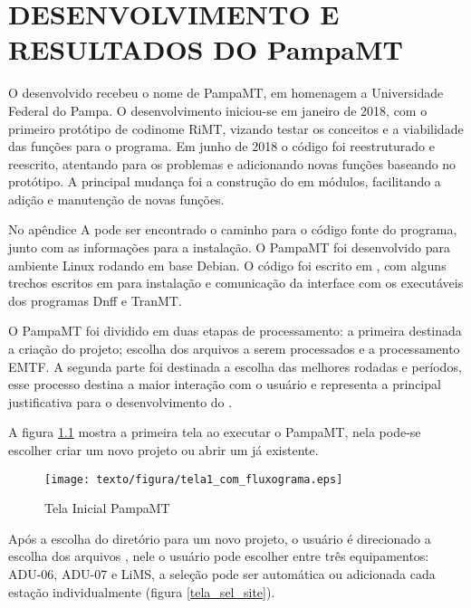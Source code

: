 \chapter{DESENVOLVIMENTO E RESULTADOS DO PampaMT}

    O  desenvolvido recebeu o nome de PampaMT, em homenagem a Universidade Federal do Pampa. O desenvolvimento iniciou-se em janeiro de 2018, com o primeiro protótipo de codinome RiMT, vizando testar os conceitos e a viabilidade das funções para o programa. Em junho de 2018 o código foi reestruturado e reescrito, atentando para os problemas e adicionando novas funções baseando no protótipo. A principal mudança foi a construção do  em módulos, facilitando a adição e manutenção de novas funções.
    
    No apêndice A pode ser encontrado o caminho para o código fonte do programa, junto com as informações para a instalação. O PampaMT foi desenvolvido para ambiente Linux rodando em base Debian. O código foi escrito em \Python, com alguns trechos escritos em \Shell{} para instalação e comunicação da interface com os executáveis dos programas Dnff e TranMT.
    
    O PampaMT foi dividido em duas etapas de processamento: a primeira destinada a criação do projeto; escolha dos arquivos a serem processados e a processamento EMTF. A segunda parte foi destinada a escolha das melhores rodadas e períodos, esse processo destina a maior interação com o usuário e representa a principal justificativa para o desenvolvimento do . 
    
    A figura \ref{tela_inicial} mostra a primeira tela ao executar o PampaMT, nela pode-se escolher criar um novo projeto ou abrir um já existente.
    
    \begin{figure}[H]
        \caption{Tela Inicial PampaMT}
            \begin{center}
                \texttt{[image: texto/figura/tela1\_com\_fluxograma.eps]}
            \end{center}
        \label{tela_inicial}
    \end{figure}
    
     Após a escolha do diretório para um novo projeto, o usuário é direcionado a escolha dos arquivos , nele o usuário pode escolher entre três equipamentos: ADU-06, ADU-07 e LiMS, a seleção pode ser automática ou adicionada cada estação individualmente (figura \ref{tela_sel_site}). 
    
